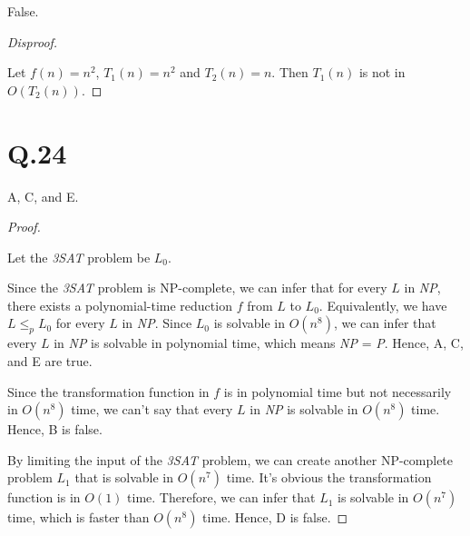 \documentclass[a4paper,12pt]{article}
\begin{document}
False.

\begin{proof}[Disproof]
$ $

Let $f(n) = n^2$, $T_1(n) = n^2$ and $T_2(n) = n$.
Then $T_1(n)$ is not in $O(T_2(n))$.
\end{proof}

\section*{Q.24}

A, C, and E.

\begin{proof}
$ $

Let the \textit{3SAT} problem be $L_0$.

Since the \textit{3SAT} problem is NP-complete, we can infer that for every $L$ in \textit{NP}, there exists a polynomial-time reduction $f$ from $L$ to $L_0$.
Equivalently, we have $L \leq_p L_0$ for every $L$ in \textit{NP}.
Since $L_0$ is solvable in $O(n^8)$, we can infer that every $L$ in \textit{NP} is solvable in polynomial time, which means \textit{NP} = \textit{P}.
Hence, A, C, and E are true.

Since the transformation function in $f$ is in polynomial time but not necessarily in $O(n^8)$ time, we can't say that every $L$ in \textit{NP} is solvable in $O(n^8)$ time.
Hence, B is false.

By limiting the input of the \textit{3SAT} problem, we can create another NP-complete problem $L_1$ that is solvable in $O(n^7)$ time.
It's obvious the transformation function is in $O(1)$ time.
Therefore, we can infer that $L_1$ is solvable in $O(n^7)$ time, which is faster than $O(n^8)$ time.
Hence, D is false.
\end{proof}
\end{document}
